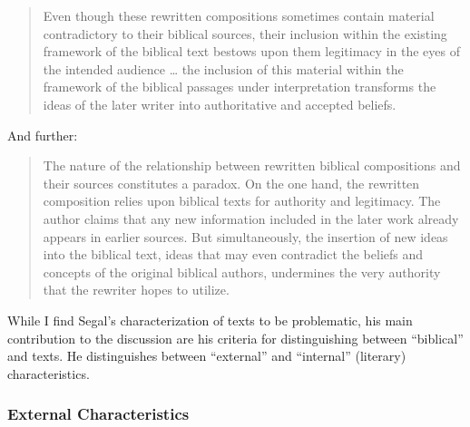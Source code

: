 \begin{quote}
    Even though these rewritten compositions sometimes contain material contradictory to their biblical sources, their inclusion within the existing framework of the biblical text bestows upon them legitimacy in the eyes of the intended audience \ldots{} the inclusion of this material within the framework of the biblical passages under interpretation transforms the ideas of the later writer into authoritative and accepted beliefs.%
        \autocite[11]{segal_henze2005}
\end{quote} 
\noindent
And further: 
\begin{quote}
    The nature of the relationship between rewritten biblical compositions and their sources constitutes a paradox. On the one hand, the rewritten composition relies upon biblical texts for authority and legitimacy. The author claims that any new information included in the later work already appears in earlier sources. But simultaneously, the insertion of new ideas into the biblical text, ideas that may even contradict the beliefs and concepts of the original biblical authors, undermines the very authority that the rewriter hopes to utilize.%
    \autocite[11-12]{segal_henze2005}
\end{quote} 
\noindent
While I find Segal's characterization of \rwb texts to be problematic,%
%
%
his main contribution to the discussion are his criteria for distinguishing between ``biblical'' and \rwb texts. He distinguishes between ``external'' and ``internal'' (literary) characteristics. 

\subsubsection{External Characteristics}

